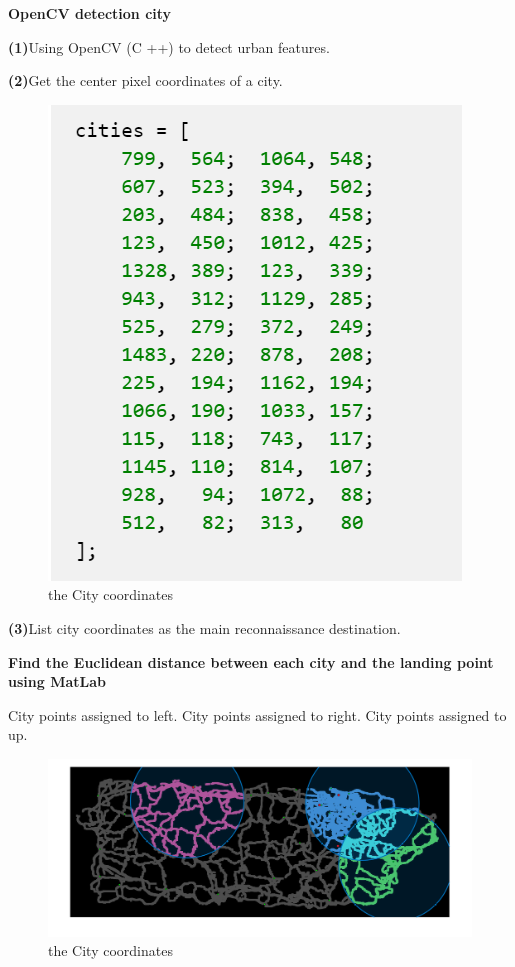 \documentclass{article} %
\begin{document}
\textbf{OpenCV detection city}


\textbf{(1)}Using OpenCV (C ++) to detect urban features.


\textbf{(2)}Get the center pixel coordinates of a city.


\begin{figure}[h]
    \centering
    \includegraphics[scale=0.7]{65.png}
    \caption{ the City coordinates}
\end{figure}


\textbf{(3)}List city coordinates as the main reconnaissance destination.


\textbf{Find the Euclidean distance between each city and the landing point using MatLab}


City points assigned to left.
City points assigned to right.
City points assigned to up.


\begin{figure}[h]
    \centering
    \includegraphics[scale=0.2]{2.png}
    \caption{ the City coordinates}
\end{figure}
\end{document}
